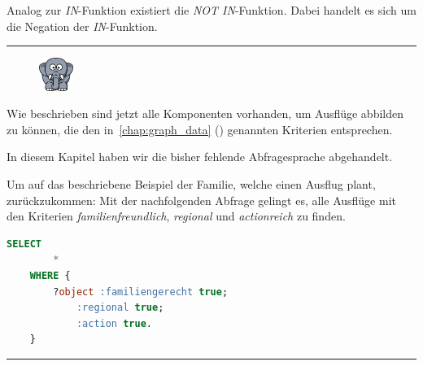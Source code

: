 Analog zur \textit{IN}-Funktion existiert die \textit{NOT IN}-Funktion. Dabei handelt es sich um die Negation der \textit{IN}-Funktion.


\noindent\rule[1ex]{\textwidth}{1pt}
\begin{figure}
    \vspace{-12pt}
    \includegraphics[width=0.1\textwidth]{bilder/elephant.png}
\end{figure}
Wie beschrieben sind jetzt alle Komponenten vorhanden, um Ausflüge abbilden zu können, die den in~\autoref{chap:graph_data} () genannten Kriterien entsprechen.

In diesem Kapitel haben wir die bisher fehlende Abfragesprache abgehandelt.

Um auf das beschriebene Beispiel der Familie, welche einen Ausflug plant, zurückzukommen: Mit der nachfolgenden Abfrage gelingt es, alle Ausflüge mit den Kriterien  \textit{familienfreundlich}, \textit{regional} und \textit{actionreich} zu finden.

\begin{lstlisting}[caption={Beispiel einer Abfrage um alle familiengerechten, actionreichen und regionalen Ausflüge der Ontologie auszugeben},captionpos=b,language=SQL]
    SELECT
        *
    WHERE {
        ?object :familiengerecht true;
            :regional true;
            :action true.
    }
\end{lstlisting}

\noindent\rule[1ex]{\textwidth}{1pt}

